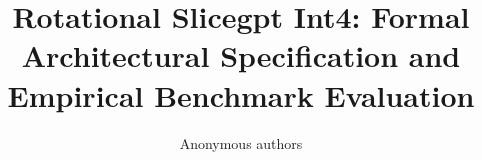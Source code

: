 \title{\textbf{Rotational Slicegpt Int4: Formal Architectural Specification and Empirical Benchmark Evaluation}}

\author{Anonymous authors}
